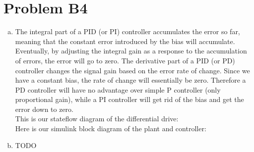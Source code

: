 \documentclass[12pt]{article}
\begin{document}
\section*{Problem B4}
\begin{enumerate}[a)]
	\item The integral part of a PID (or PI) controller accumulates the error so far, meaning that the constant error introduced by the bias will accumulate. Eventually, by adjusting the integral gain as a response to the accumulation of errors, the error will go to zero. The derivative part of a PID (or PD) controller changes the signal gain based on the error rate of change. Since we have a constant bias, the rate of change will essentially be zero. Therefore a PD controller will have no advantage over simple P controller (only proportional gain), while a PI controller will get rid of the bias and get the error down to zero.\\
This is our stateflow diagram of the differential drive:\\
Here is our simulink block diagram of the plant and controller:\\

	\item TODO
\end{enumerate}
\end{document}
